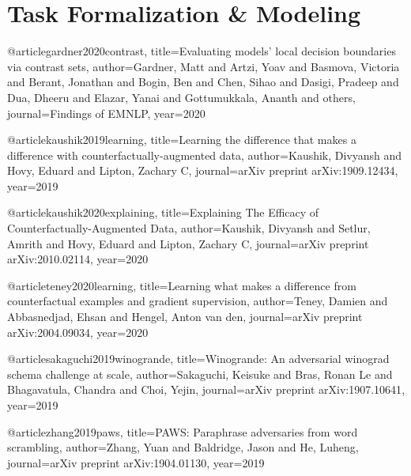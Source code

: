\section{Task Formalization \& Modeling}

\begin{comment}
* Define the task
- Some math
- Several different application domains
    - augmentation
    - adversarial attack
    - extend data
    - counterfactual explanation
- Importance of where to change and how to change

* How to train
- Compute control tags
- Special tokens

* Use existing datasets
- Why each dataset 
- Data distribution [maybe appendix]

* Training hyperparameters

* Evaluations
- Filtering
- Diversity
\end{comment}


@article{gardner2020contrast,
  title={Evaluating models' local decision boundaries via contrast sets},
  author={Gardner, Matt and Artzi, Yoav and Basmova, Victoria and Berant, Jonathan and Bogin, Ben and Chen, Sihao and Dasigi, Pradeep and Dua, Dheeru and Elazar, Yanai and Gottumukkala, Ananth and others},
  journal={Findings of EMNLP},
  year={2020}
}

@article{kaushik2019learning,
  title={Learning the difference that makes a difference with counterfactually-augmented data},
  author={Kaushik, Divyansh and Hovy, Eduard and Lipton, Zachary C},
  journal={arXiv preprint arXiv:1909.12434},
  year={2019}
}

@article{kaushik2020explaining,
  title={Explaining The Efficacy of Counterfactually-Augmented Data},
  author={Kaushik, Divyansh and Setlur, Amrith and Hovy, Eduard and Lipton, Zachary C},
  journal={arXiv preprint arXiv:2010.02114},
  year={2020}
}

@article{teney2020learning,
  title={Learning what makes a difference from counterfactual examples and gradient supervision},
  author={Teney, Damien and Abbasnedjad, Ehsan and Hengel, Anton van den},
  journal={arXiv preprint arXiv:2004.09034},
  year={2020}
}


@article{sakaguchi2019winogrande,
  title={Winogrande: An adversarial winograd schema challenge at scale},
  author={Sakaguchi, Keisuke and Bras, Ronan Le and Bhagavatula, Chandra and Choi, Yejin},
  journal={arXiv preprint arXiv:1907.10641},
  year={2019}
}

@article{zhang2019paws,
  title={PAWS: Paraphrase adversaries from word scrambling},
  author={Zhang, Yuan and Baldridge, Jason and He, Luheng},
  journal={arXiv preprint arXiv:1904.01130},
  year={2019}
}

